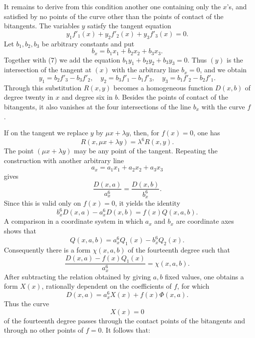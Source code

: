 \documentclass[11pt]{article}
\begin{document}
It remains to derive from this condition another one containing only the \(x\)'s, and satisfied by no points of the curve other than the points of contact of the bitangents. The variables \(y\) satisfy the tangent equation
\begin{equation}
 y_1f'_1(x)+y_2f'_2(x)+y_3f'_3(x)=0.
 \tag{7}
\end{equation}
Let \(b_1,b_2,b_3\) be arbitrary constants and put
\begin{equation}
 b_x=b_1x_1+b_2x_2+b_3x_3.
 \tag{8}
\end{equation}
Together with (7) we add the equation \(b_1y_1+b_2y_2+b_3y_3=0\). Thus \((y)\) is the intersection of the tangent at \((x)\) with the arbitrary line \(b_x=0\), and we obtain
\begin{equation}
 y_1=b_2f'_3-b_3f'_2,
 \quad y_2=b_3f'_1-b_1f'_3,
 \quad y_3=b_1f'_2-b_2f'_1.
 \tag{10}
\end{equation}
Through this substitution \(R(x,y)\) becomes a homogeneous function \(D(x,b)\) of degree twenty in \(x\) and degree six in \(b\). Besides the points of contact of the bitangents, it also vanishes at the four intersections of the line \(b_x\) with the curve \(f\).

If on the tangent we replace \(y\) by \(\mu x+\lambda y\), then, for \(f(x)=0\), one has
\begin{equation}
 R(x,\mu x+\lambda y)=\lambda^6R(x,y).
 \tag{11}
\end{equation}
The point \((\mu x+
\lambda y)\) may be any point of the tangent. Repeating the construction with another arbitrary line
\begin{equation}
 a_x=a_1x_1+a_2x_2+a_3x_3
 \tag{13}
\end{equation}
gives
\begin{equation}
 \frac{D(x,a)}{a_x^6}=\frac{D(x,b)}{b_x^6}.
 \tag{14}
\end{equation}
Since this is valid only on \(f(x)=0\), it yields the identity
\begin{equation}
 b_x^6D(x,a)-a_x^6D(x,b)=f(x)Q(x,a,b).
 \tag{15}
\end{equation}
A comparison in a coordinate system in which \(a_x\) and \(b_x\) are coordinate axes shows that
\[
 Q(x,a,b)=a_x^6Q_1(x)-b_x^6Q_2(x).
\]
Consequently there is a form \(\chi(x,a,b)\) of the fourteenth degree such that
\begin{equation}
 \frac{D(x,a)-f(x)Q_1(x)}{a_x^6}=\chi(x,a,b).
 \tag{16}
\end{equation}
After subtracting the relation obtained by giving \(a,b\) fixed values, one obtains a form \(X(x)\), rationally dependent on the coefficients of \(f\), for which
\begin{equation}
 D(x,a)=a_x^6X(x)+f(x)\Phi(x,a).
 \tag{18}
\end{equation}
Thus the curve
\begin{equation}
 X(x)=0
 \tag{19}
\end{equation}
of the fourteenth degree passes through the contact points of the bitangents and through no other points of \(f=0\). It follows that:
\end{document}
